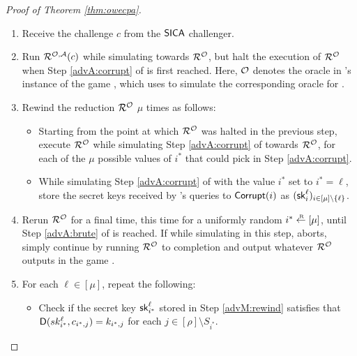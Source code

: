 \begin{proof}[Proof of Theorem \ref{thm:owecpa}]
  \begin{enumerate}[itemsep=0.1cm]
    \item Receive the challenge \(c\) from the \(\mathsf{SICA}\) challenger.
    \item Run \(\redR^{\oracle,\advA}(c)\) while simulating \advA towards \(\redR^{\oracle}\),
          but halt the execution of \(\redR^{\oracle}\) when Step \ref{advA:corrupt} of \advA
          is first reached.
          Here, \(\mathcal{O}\) denotes the oracle in \redM's instance of the game \SICA,
          which \redM uses to simulate the corresponding oracle for \redR.
    \item\label{advM:rewind}
          Rewind the reduction \(\redR^{\oracle}\) \(\mu\) times as follows:
          \begin{itemize}[label={\textbullet},itemsep=0.1cm]
            \item Starting from the point at which \(\redR^{\oracle}\) was halted in
                  the previous step, execute \(\redR^{\oracle}\) while simulating Step
                  \ref{advA:corrupt} of \advA towards \(\redR^{\oracle}\),
                  for each of the \(\mu\) possible values of \(i^{*}\)
                  that \advA could pick in Step \ref{advA:corrupt}.
            \item While simulating Step \ref{advA:corrupt} of \advA
                  with the value \(i^{*}\) set to \(i^{*} = \ell\),
                  store the secret keys received by \advA's queries to \(\mathsf{Corrupt}(i)\)
                  as \((\mathsf{sk}_{i}^{\ell})_{i \in [\mu] \setminus \{\ell\}}\).
          \end{itemize}
    \item\label{advM:sample} Rerun \(\redR^{\oracle}\) for a final time, this time for a uniformly random \(i^{*} \sampleR [\mu]\),
          until Step \ref{advA:brute} of \advA is reached.
          If while simulating \advA in this step, \advA aborts,
          simply continue by running \(\redR^{\oracle}\) to completion
          and output whatever \(\redR^{\oracle}\) outputs in the game \SICA.
    \item\label{advM:key} For each \(\ell \in [\mu]\), repeat the following:
          \begin{itemize}[label={\textbullet},itemsep=0.1cm]
            \item Check if the secret key \(\mathsf{sk}_{i^{*}}^{\ell}\)
                  stored in Step \ref{advM:rewind} satisfies that
                  \(\mathsf{D}(sk_{i^{*}}^{\ell},c_{i^{*},j}) = k_{i^{*},j}\)
                  for each \(j \in [\rho] \setminus S_{i^{*}}\).

\end{itemize}
\end{enumerate}
\end{proof}
